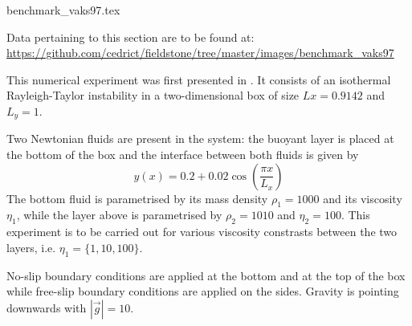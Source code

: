 \begin{flushright} {\tiny {\color{gray} benchmark\_vaks97.tex}} \end{flushright}

\vspace{1cm}
\begin{flushright}
Data pertaining to this section are to be found at:
\url{https://github.com/cedrict/fieldstone/tree/master/images/benchmark_vaks97}
\end{flushright}
\vspace{1cm}


This numerical experiment was first presented in \cite{vaks97}.
It consists of an isothermal Rayleigh-Taylor instability in a two-dimensional box
of size $Lx=0.9142$ and $L_y=1$.

Two Newtonian fluids are present in the system: the buoyant layer is placed at the bottom of 
the box and the interface between both fluids is given by 
\begin{equation}
y(x)=0.2+0.02\cos \left( \frac{\pi x}{L_x}  \right)
\end{equation}
The bottom fluid is parametrised by its mass density $\rho_1=1000$ and its viscosity $\eta_1$, 
while the layer above is parametrised by $\rho_2=1010$ and $\eta_2=100$.
This experiment is to be carried out for various viscosity constrasts between the 
two layers, i.e. $\eta_1=\{1,10,100\}$.

No-slip boundary conditions are applied at the bottom and at the top of the box 
while free-slip boundary conditions are applied on the sides.
Gravity is pointing downwards with $|\vec{g}|=10$. 

